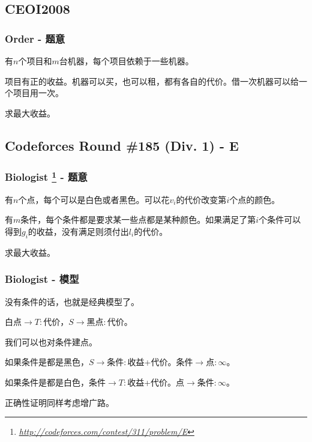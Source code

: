 \documentclass[9pt,dvipsnames,table]{beamer}
\newcommand{\hlink}[1]{
	\footnote{\fontsize{6pt}{\baselineskip}\href{#1}{\textsl{\underline{#1}}}}
}
\begin{document}
\subsection{CEOI2008}
\begin{frame}
	\frametitle{Order - 题意}
	有$n$个项目和$m$台机器，每个项目依赖于一些机器。
	
	项目有正的收益。机器可以买，也可以租，都有各自的代价。借一次机器可以给一个项目用一次。
	
	求最大收益。
\end{frame}

\subsection{Codeforces Round \#185 (Div. 1) - E}
\begin{frame}
	\frametitle{Biologist\hlink{http://codeforces.com/contest/311/problem/E} - 题意}
	有$n$个点，每个可以是白色或者黑色。可以花$v_i$的代价改变第$i$个点的颜色。
	
	有$m$条件，每个条件都是要求某一些点都是某种颜色。如果满足了第$i$个条件可以得到$g_i$的收益，没有满足则须付出$l_i$的代价。
	
	求最大收益。
\end{frame}
\begin{frame}
	\frametitle{Biologist - 模型}
	没有条件的话，也就是经典模型了。
	
	白点$\rightarrow T:$代价，$S\rightarrow$黑点$:$代价。\pause
	
	我们可以也对条件建点。
	
	如果条件是都是黑色，$S\rightarrow$条件$:$收益+代价。条件$\rightarrow$点$:\infty$。
	
	如果条件是都是白色，条件$\rightarrow T:$收益+代价。点$\rightarrow$条件$:\infty$。
	
	正确性证明同样考虑增广路。
\end{frame}
\end{document}
